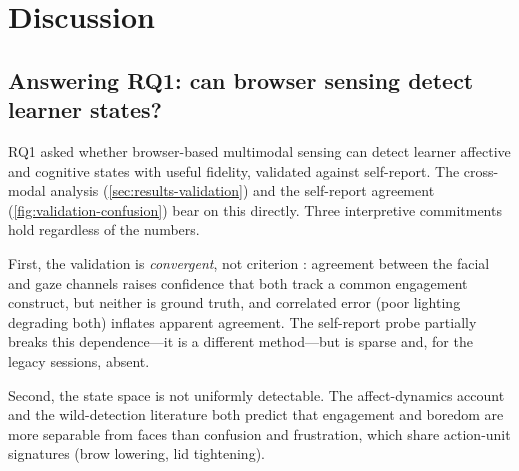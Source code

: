 \chapter{Discussion}
\label{ch:discussion}


\section{Answering RQ1: can browser sensing detect learner states?}
\label{sec:discussion-rq1}

RQ1 asked whether browser-based multimodal sensing can detect learner
affective and cognitive states with useful fidelity, validated against
self-report. The cross-modal analysis (\cref{sec:results-validation}) and
the self-report agreement (\cref{fig:validation-confusion}) bear on this
directly.  Three interpretive commitments hold regardless of the numbers.

First, the validation is \emph{convergent}, not criterion
\citep{campbell1959}: agreement between the facial and gaze channels
raises confidence that both track a common engagement construct, but
neither is ground truth, and correlated error (poor lighting degrading
both) inflates apparent agreement. The self-report probe partially breaks
this dependence---it is a different method---but is sparse and, for the
legacy sessions, absent.

Second, the state space is not uniformly detectable. The affect-dynamics
account \citep{dmello2012dynamics} and the wild-detection literature
\citep{bosch2016} both predict that engagement and boredom are more
separable from faces than confusion and frustration, which share
action-unit signatures (brow lowering, lid tightening). 

